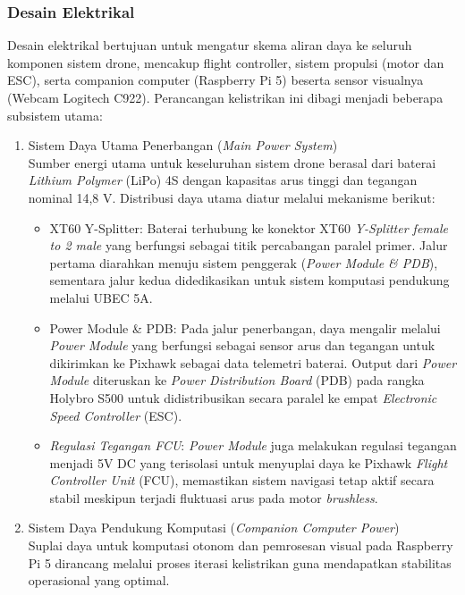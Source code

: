 \subsubsection{Desain Elektrikal}
Desain elektrikal bertujuan untuk mengatur skema aliran daya ke seluruh komponen sistem drone, mencakup flight controller, sistem propulsi (motor dan ESC), serta companion computer (Raspberry Pi 5) beserta sensor visualnya (Webcam Logitech C922). Perancangan kelistrikan ini dibagi menjadi beberapa subsistem utama:
\begin{enumerate}
	\item Sistem Daya Utama Penerbangan (\textit{Main Power System})\\
	Sumber energi utama untuk keseluruhan sistem drone berasal dari baterai \textit{Lithium Polymer} (LiPo) 4S dengan kapasitas arus tinggi dan tegangan nominal 14,8 V. Distribusi daya utama diatur melalui mekanisme berikut:
	\begin{itemize}
		\item XT60 Y-Splitter: Baterai terhubung ke konektor XT60 \textit{Y-Splitter female to 2 male} yang berfungsi sebagai titik percabangan paralel primer. Jalur pertama diarahkan menuju sistem penggerak (\textit{Power Module \& PDB}), sementara jalur kedua didedikasikan untuk sistem komputasi pendukung melalui UBEC 5A.
		\item Power Module \& PDB: Pada jalur penerbangan, daya mengalir melalui \textit{Power Module} yang berfungsi sebagai sensor arus dan tegangan untuk dikirimkan ke Pixhawk sebagai data telemetri baterai. Output dari \textit{Power Module} diteruskan ke \textit{Power Distribution Board} (PDB) pada rangka Holybro S500 untuk didistribusikan secara paralel ke empat \textit{Electronic Speed Controller} (ESC).
		\item \textit{Regulasi Tegangan FCU}: \textit{Power Module} juga melakukan regulasi tegangan menjadi 5V DC yang terisolasi untuk menyuplai daya ke Pixhawk \textit{Flight Controller Unit} (FCU), memastikan sistem navigasi tetap aktif secara stabil meskipun terjadi fluktuasi arus pada motor \textit{brushless}.
	\end{itemize}
	
	\item Sistem Daya Pendukung Komputasi (\textit{Companion Computer Power})\\
	Suplai daya untuk komputasi otonom dan pemrosesan visual pada Raspberry Pi 5 dirancang melalui proses iterasi kelistrikan guna mendapatkan stabilitas operasional yang optimal.
	

\end{enumerate}
